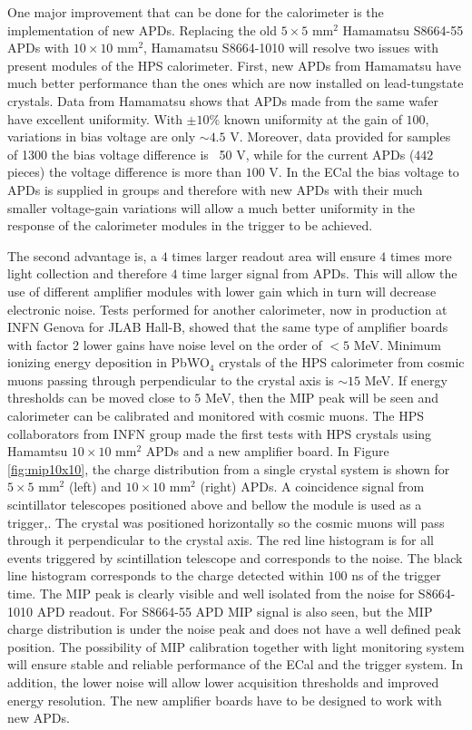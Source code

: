 One major improvement that can be done for the calorimeter is the implementation of new APDs. Replacing the old $5\times 5$ mm$^2$ Hamamatsu S8664-55 APDs with $10\times 10$ mm$^2$, Hamamatsu S8664-1010 will resolve two issues with present modules of the HPS calorimeter. First, new APDs from Hamamatsu have much better performance than the ones which are now installed on lead-tungstate crystals. Data from Hamamatsu shows that APDs made from the same wafer have excellent uniformity. With $\pm 10\%$ known uniformity at the gain of $100$, variations in bias voltage are only $\sim 4.5$ V. Moreover, data provided for samples of 1300 the bias voltage difference is ~50 V, while for the current APDs ($442$ pieces) the voltage difference is more than $100$ V. In the ECal the bias voltage to APDs is supplied in  groups and therefore with new APDs with their  much smaller voltage-gain variations will allow a much better uniformity in the response of the calorimeter modules in the trigger to be achieved. 

The second advantage is, a $4$ times larger readout area will ensure $4$ times more light collection and therefore $4$ time larger signal from APDs. This will allow the use of different amplifier modules with lower gain which in turn will decrease electronic noise. Tests performed for another calorimeter, now in production at INFN Genova for JLAB Hall-B, showed that the same type of amplifier boards with factor 2 lower gains have noise level on the order of $<5$ MeV. Minimum ionizing energy deposition in PbWO$_4$ crystals of the HPS calorimeter from cosmic muons passing through perpendicular to the crystal axis is $\sim 15$ MeV. If energy thresholds can be moved close to $5$ MeV, then the MIP peak will be seen and calorimeter can be calibrated and monitored with cosmic muons. The HPS collaborators from INFN group made the first tests with HPS crystals using Hamamtsu $10\times 10$ mm$^2$ APDs and a new amplifier board. In Figure \ref{fig:mip10x10}, the charge distribution from a single crystal system is shown for $5\times 5$ mm$^2$ (left) and $10\times 10$ mm$^2$ (right) APDs. A coincidence signal from scintillator telescopes positioned above and bellow the module is used as a trigger,. The crystal was positioned horizontally so the cosmic muons will pass through it perpendicular to the crystal axis. The red line histogram is for all events triggered by scintillation telescope and corresponds to the noise. The black line histogram corresponds to the charge detected within $100$ ns of the trigger time. The MIP peak is clearly visible and well isolated from the noise for S8664-1010 APD readout. For  S8664-55 APD MIP signal is also seen, but the MIP charge distribution is under the noise peak and does not have a well defined peak position. The possibility of MIP calibration together with light monitoring system will ensure stable and reliable performance of the ECal and the trigger system. In addition, the lower noise will allow lower acquisition thresholds and improved energy resolution. The new amplifier boards have to be designed to work with new APDs. 

